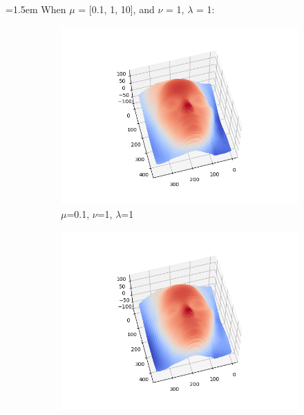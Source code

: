 \documentclass{article}
\begin{document}
	\hangindent=1.5em \hspace{1.5em}When $\mu$ = [0.1, 1, 10], and $\nu$ = 1, $\lambda$ = 1: \\
\begin{figure}[H]
	\centering
	\begin{subfigure}{0.33\textwidth}
		\centering
		\includegraphics[width=\textwidth]{./src/2f_mu_change/faceCalibrated_mu_0.1_v_1_lambda_1.png}
		\caption{$\mu$=0.1, $\nu$=1, $\lambda$=1}
	\end{subfigure}
	\hfill
	\begin{subfigure}{0.32\textwidth}
		\centering
		\includegraphics[width=\textwidth]{./src/2f_mu_change/faceCalibrated_mu_1_v_1_lambda_1.png}

\end{subfigure}
\end{figure}
\end{document}
